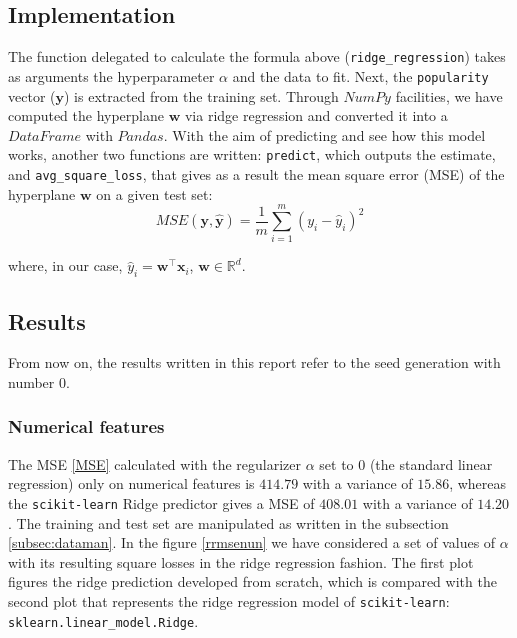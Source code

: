 \documentclass{article}
\begin{document}
\subsection{Implementation}
The function delegated to calculate the formula above (\texttt{ridge\_regression}) takes as arguments the hyperparameter $\alpha$ and the data to fit. Next, the \texttt{popularity} vector ($\boldsymbol{y}$) is extracted from the training set. Through $NumPy$ facilities, we have computed the hyperplane $\boldsymbol{w}$ via ridge regression and converted it into a $DataFrame$ with $Pandas$. 
With the aim of predicting and see how this model works, another two functions are written:
\texttt{predict}, which outputs the estimate, and \texttt{avg\_square\_loss}, that gives as a result the mean square error (MSE) of the hyperplane $\boldsymbol{w}$ on a given test set: 
\begin{equation}
	\label{MSE}MSE(\boldsymbol{y},\boldsymbol{\hat{y}}) = \frac{1}{m}\sum_{i = 1}^m (y_i-\hat{y}_i)^2
\end{equation}
    
where, in our case, $\hat{y}_i= \boldsymbol{w}^\top \boldsymbol{x}_i$, $\boldsymbol{w} \in \mathbb{R}^d$.
    
\subsection{Results}
From now on, the results written in this report refer to the seed generation with number $0$.
\subsubsection{Numerical features}

The MSE \eqref{MSE} calculated with the regularizer $\alpha$ set to $0$ (the standard linear regression) only on numerical features is $414.79$ with a variance of $15.86$, whereas the \texttt{scikit-learn} Ridge predictor gives a MSE of $408.01$ with a variance of $14.20$. The training and test set are manipulated as written in the subsection \ref{subsec:dataman}. In the figure \ref{rrmsenun} we have considered a set of values of $\alpha$ with its resulting square losses in the ridge regression fashion. The first plot figures the ridge prediction developed from scratch, which is compared with the second plot that represents the ridge regression model of \texttt{scikit-learn}: \texttt{sklearn.linear\_model.Ridge}. 
\end{document}
